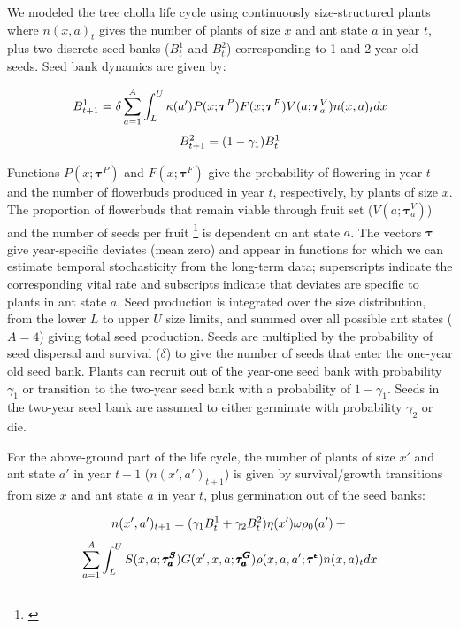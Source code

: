 \documentclass[11pt]{article}
\newcommand{\tom}[2]{{\color{red}{#1}}\footnote{\textit{\color{red}{#2}}}}
\begin{document}
We modeled the tree cholla life cycle using continuously size-structured plants where $n(x,a)_{t}$ gives the number of plants of size $x$  and ant state $a$ in year $t$, plus two discrete seed banks ($B^1_{t}$ and $B^2_{t}$) corresponding to 1 and 2-year old seeds. 
Seed bank dynamics are given by:

\begin{linenomath*}
	$$
	B^1_{t+1} = \delta \sum_{a=1}^{A} \int_L^U  \kappa(a') P(x;\pmb{\tau}^P) F(x;\pmb{\tau}^F) V(a;\pmb{\tau}^V_{a}) n(x,a)_{t} dx \\
	$$
	$$
	B^2_{t+1} =  (1 - \gamma_1)B^1_{t}\\
	$$
	\label{eqn:IPM1}
\end{linenomath*}

\noindent %
Functions $P(x;\pmb{\tau}^P)$ and $F(x;\pmb{\tau}^F)$ give the probability of flowering in year $t$ and the number of flowerbuds produced in year $t$, respectively, by plants of size $x$. 
The proportion of flowerbuds that remain viable through fruit set ($V(a;\pmb{\tau}^V_{a})$) and the number of seeds per fruit \tom{($\kappa(a)$)}{This is correct but in the equation above it is shown as $\kappa(a')$ -- I am flagging that so you can update the equation and check that the code is consistent.} is dependent on ant state $a$. 
The vectors $\pmb{\tau}$ give year-specific deviates (mean zero) and appear in functions for which we can estimate temporal stochasticity from the long-term data; superscripts indicate the corresponding vital rate and subscripts indicate that deviates are specific to plants in ant state $a$.
Seed production is integrated over the size distribution, from the lower $L$ to upper $U$ size limits, and summed over all possible ant states ($A=4$) giving total seed production. 
Seeds are multiplied by the probability of seed dispersal and survival ($\delta$) to give the number of seeds that enter the one-year old seed bank. 
Plants can recruit out of the year-one seed bank with probability $\gamma_1$ or transition to the two-year seed bank with a probability of $1 - \gamma_1$. 
Seeds in the two-year seed bank are assumed to either germinate with probability $\gamma_2$ or die. 

For the above-ground part of the life cycle, the number of plants of size $x'$ and ant state $a'$ in year $t+1$ ($n(x',a')_{t+1}$) is given by survival/growth transitions from size $x$ and ant state $a$ in year $t$, plus germination out of the seed banks:
\begin{linenomath*}
	$$
	n(x',a')_{t+1} = (\gamma_1 B^1_{t} + \gamma_2 B^2_{t} ) \eta(x') \omega \rho_{0}(a')  + \\
	$$
	$$
	\sum_{a=1}^{A} \int_L^U S(x,a;\pmb{\tau^S_{a}}) G(x',x,a;\pmb{\tau^G_{a}}) \rho(x,a,a';\pmb{\tau^{\epsilon}}) n(x,a)_t dx \\
	$$
	\label{eqn:IPM2}
\end{linenomath*}
\end{document}
